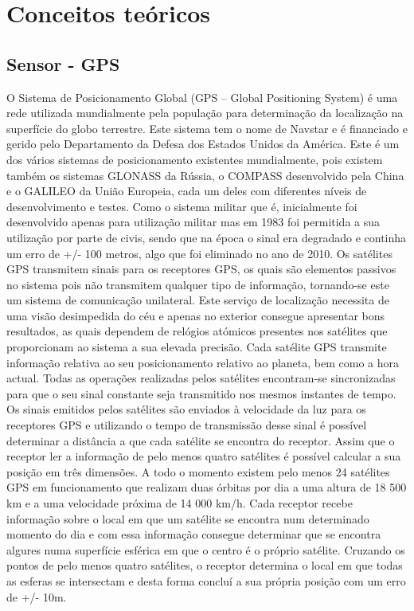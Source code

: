 \chapter{Conceitos teóricos}
\label{cha:conceitos_teoricos}

\section{Sensor - GPS}
\label{sec:gps}

O Sistema de Posicionamento Global (GPS – Global Positioning System) é uma rede utilizada mundialmente pela população para determinação da localização na superfície do globo terrestre. 
Este sistema tem o nome de Navstar e é financiado e gerido pelo Departamento da Defesa dos Estados Unidos da América.
Este é um dos vários sistemas de posicionamento existentes mundialmente, pois existem também os sistemas GLONASS da Rússia, o COMPASS desenvolvido pela China e o GALILEO da União Europeia, cada um deles com diferentes níveis de desenvolvimento e testes.
Como o sistema militar que é, inicialmente foi desenvolvido apenas para utilização militar mas em 1983 foi permitida a sua utilização por parte de civis, sendo que na época o sinal era degradado e continha um erro de +/- 100 metros, algo que foi eliminado no ano de 2010.
Os satélites GPS transmitem sinais para os receptores GPS, os quais são elementos passivos no sistema pois não transmitem qualquer tipo de informação, tornando-se este um sistema de comunicação unilateral.
Este serviço de localização necessita de uma visão desimpedida do céu e apenas no exterior consegue apresentar bons resultados, as quais dependem de relógios atómicos presentes nos satélites que proporcionam ao sistema a sua elevada precisão.
Cada satélite GPS transmite informação relativa ao seu posicionamento relativo ao planeta, bem como a hora actual.
Todas as operações realizadas pelos satélites encontram-se sincronizadas para que o seu sinal constante seja transmitido nos mesmos instantes de tempo.
Os sinais emitidos pelos satélites são enviados à velocidade da luz para os receptores GPS e utilizando o tempo de transmissão desse sinal é possível determinar a distância a que cada satélite se encontra do receptor.
Assim que o receptor ler a informação de pelo menos quatro satélites é possível calcular a sua posição em três dimensões.
A todo o momento existem pelo menos 24 satélites GPS em funcionamento que realizam duas órbitas por dia a uma altura de 18 500 km e a uma velocidade próxima de 14 000 km/h.
Cada receptor recebe informação sobre o local em que um satélite se encontra num determinado momento do dia e com essa informação consegue determinar que se encontra algures numa superfície esférica em que o centro é o próprio satélite.
Cruzando os pontos de pelo menos quatro satélites, o receptor determina o local em que todas as esferas se intersectam e desta forma concluí a sua própria posição com um erro de +/- 10m.

